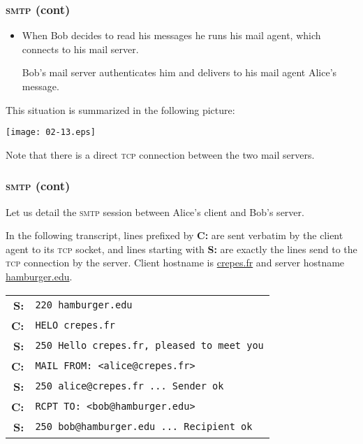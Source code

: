 %
\begin{frame}
\frametitle{\textsc{smtp} (cont)}

\begin{itemize}

  \item When Bob decides to read his messages he runs his mail agent,
    which connects to his mail server.

    Bob's mail server authenticates him and delivers to his mail
    agent Alice's message.

\end{itemize}
This situation is summarized in the following picture:
\begin{center}
\texttt{[image: 02-13.eps]}
\end{center}
Note that there is a direct \textsc{tcp} connection between the two
mail servers.
\end{frame}

%
\begin{frame}[containsverbatim]
\frametitle{\textsc{smtp} (cont)}

Let us detail the \textsc{smtp} session between Alice's client and
Bob's server.

In the following transcript, lines prefixed by \textbf{C:} are sent
verbatim by the client agent to its \textsc{tcp} socket, and lines
starting with \textbf{S:} are exactly the lines send to the
\textsc{tcp} connection by the server. Client hostname is
\url{crepes.fr} and server hostname \url{hamburger.edu}.
{\small
\begin{tabular}{rl}
\textbf{S:} & \verb+220 hamburger.edu+\\
\textbf{C:} & \verb+HELO crepes.fr+\\
\textbf{S:} & \verb+250 Hello crepes.fr, pleased to meet you+\\
\textbf{C:} & \verb+MAIL FROM: <alice@crepes.fr>+\\
\textbf{S:} & \verb+250 alice@crepes.fr ... Sender ok+\\
\textbf{C:} & \verb+RCPT TO: <bob@hamburger.edu>+\\
\textbf{S:} & \verb+250 bob@hamburger.edu ... Recipient ok+
\end{tabular}
}

\end{frame}

